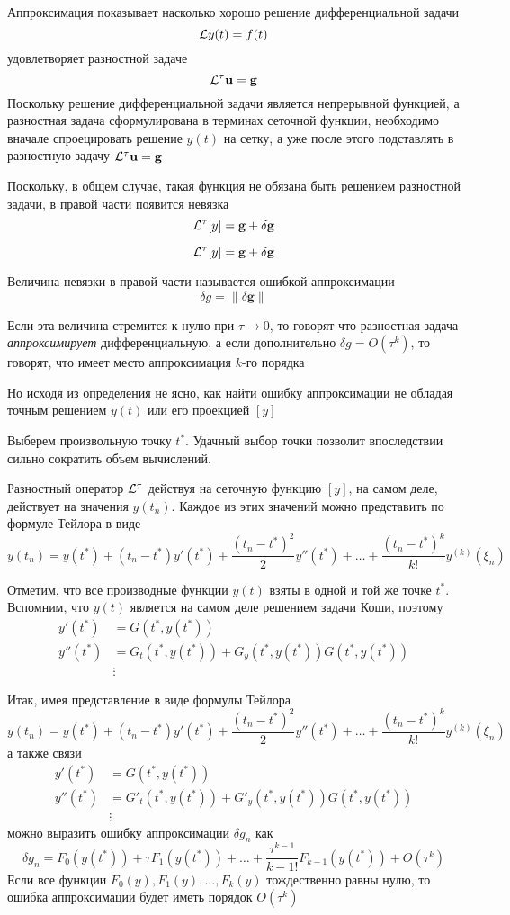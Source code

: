 \documentclass[professionalfonts,compress,unicode]{beamer}
\begin{document}
{
	Аппроксимация показывает насколько хорошо решение дифференциальной задачи 
	$$
	\mathcal{L} y(t) = f(t)
	$$
	удовлетворяет разностной задаче
	$$
	{\mathcal{L}^{\tau}} \mathbf{u} = \mathbf{g}
	$$
	\pause
	Поскольку решение дифференциальной задачи является непрерывной функцией, а разностная задача 
	сформулирована в терминах сеточной функции, необходимо вначале спроецировать решение $y(t)$ на сетку,
	а уже после этого подставлять в разностную задачу ${\mathcal{L}^{\tau}} \mathbf{u} = \mathbf{g}$
	\pause
	
	Поскольку, в общем случае, такая функция не обязана быть решением разностной задачи, в правой части появится невязка
	$$
	{\mathcal{L}^{\tau}} [y] = \mathbf{g} + \delta \mathbf{g}
	$$
}

{
	$$
	{\mathcal{L}^{\tau}} [y] = \mathbf{g} + \delta \mathbf{g}
	$$
	
	Величина невязки в правой части называется ошибкой аппроксимации
	$$
	\delta g = \|\delta \mathbf{g}\|
	$$
	
	Если эта величина стремится к нулю при $\tau \rightarrow 0$, то говорят что разностная задача \emph{аппроксимирует}
	дифференциальную, а если дополнительно $\delta g = O(\tau^k)$, то говорят, что имеет место аппроксимация $k$-го порядка
	\pause
	
	Но исходя из определения не ясно, как найти ошибку аппроксимации не обладая 
	точным решением $y(t)$ или его проекцией $[y]$
}

{
	Выберем произвольную точку $t^*$. Удачный выбор точки позволит впоследствии сильно сократить объем вычислений.
	
	Разностный оператор ${\mathcal{L}^{\tau}}$ действуя на сеточную функцию $[y]$, на самом деле, действует на значения $y(t_n)$.
	Каждое из этих значений можно представить по формуле Тейлора в виде
	$$
	y(t_n) = y(t^*) + (t_n-t^*) y'(t^*) + \frac{(t_n-t^*)^2}{2} y''(t^*) + \dots + \frac{(t_n-t^*)^k}{k!} y^{(k)}(\xi_n)
	$$
	
	Отметим, что все производные функции $y(t)$ взяты в одной и той же точке $t^*$. 
	Вспомним, что $y(t)$ является на самом деле	решением задачи Коши, поэтому 
	\begin{align*}
	y'(t^*) &= G(t^*, y(t^*))\\
	y''(t^*) &= G_t(t^*, y(t^*))+G_y(t^*, y(t^*))G(t^*, y(t^*))\\
	&\vdots
	\end{align*}
}

{
	Итак, имея представление в виде формулы Тейлора
	$$
	y(t_n) = y(t^*) + (t_n-t^*) y'(t^*) + \frac{(t_n-t^*)^2}{2} y''(t^*) + \dots + \frac{(t_n-t^*)^k}{k!} y^{(k)}(\xi_n)
	$$
	а также связи
	\begin{align*}
	y'(t^*) &= G(t^*, y(t^*))\\
	y''(t^*) &= G'_t(t^*, y(t^*))+G'_y(t^*, y(t^*))G(t^*, y(t^*))\\
	&\vdots
	\end{align*}
	можно выразить ошибку аппроксимации $\delta g_n$ как 
	$$
	\delta g_n = F_0(y(t^*)) + \tau F_1(y(t^*)) + \dots + \frac{\tau^{k-1}}{{k-1}!} F_{k-1}(y(t^*)) + O(\tau^{k})
	$$
	Если все функции $F_0(y), F_1(y), ..., F_k(y)$ тождественно равны нулю, то ошибка аппроксимации будет иметь порядок $O(\tau^k)$
}
\end{document}
